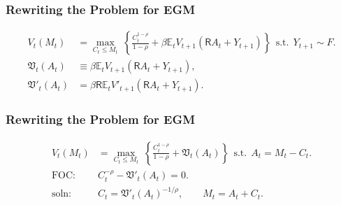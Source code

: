 \documentclass[aspectratio=169]{beamer}
\newcommand{\E}{\mathbb{E}}
\begin{document}
\begin{frame}
\frametitle{Rewriting the Problem for EGM}

\begin{align*}
V_t(M_t) &= \max_{C_t \leq M_t} ~ \left\{ \frac{C_t^{1-\rho}}{1-\rho} + \beta \E_t V_{t+1}(\mathsf{R} A_t + Y_{t+1}) \right\} ~~\text{s.t.}~~  Y_{t+1} \sim F. \\
\mathfrak{V}_t(A_t) &\equiv \beta \E_t V_{t+1}(\mathsf{R} A_t + Y_{t+1}), \\
\mathfrak{V}'_t(A_t) &= \beta \mathsf{R} \E_t V'_{t+1}(\mathsf{R} A_t + Y_{t+1}).
\end{align*}

\end{frame}


\begin{frame}
\frametitle{Rewriting the Problem for EGM}

\begin{align*}
V_t(M_t) &= \max_{C_t \leq M_t} ~ \left\{ \frac{C_t^{1-\rho}}{1-\rho} + \mathfrak{V}_t(A_t) \right\} ~~\text{s.t.}~~  A_t = M_t - C_t. \\
\text{FOC:}~~ & C_t^{-\rho} - \mathfrak{V}'_t(A_t) = 0. \\
\text{soln:}~~ & C_t = \mathfrak{V}'_t(A_t)^{-1/\rho},  \qquad M_t = A_t + C_t. \\
\end{align*}

\end{frame}
\end{document}

